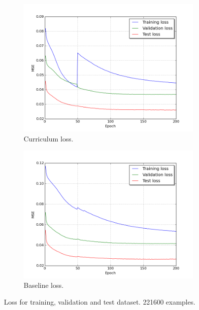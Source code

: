 \begin{figure}
\begin{subfigure}{0.48\textwidth}
\includegraphics[width=\linewidth]{figs/curr100/curriculum_loss_curves.png}
\caption{Curriculum loss.} \label{fig:curr100_loss2}
\end{subfigure}
\hspace*{\fill} %
\begin{subfigure}{0.48\textwidth}
\includegraphics[width=\linewidth]{figs/curr100/baseline_loss_curves.png}
\caption{Baseline loss.} \label{fig:curr100_epochs_baseline2}
\end{subfigure}
\hspace*{\fill} %
\caption{Loss for training, validation and test dataset. 221600 examples.} \label{fig:curr100_loss_epochs}
\end{figure}

